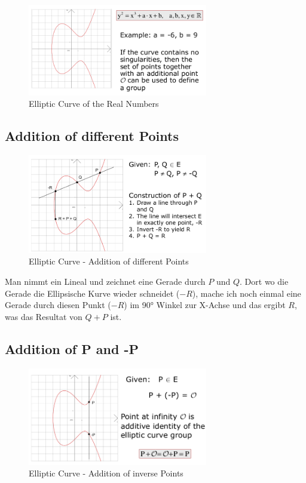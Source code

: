 \begin{figure}[H]
\centering
\includegraphics[width=0.7\textwidth]{figures/ellipticCurveRealNumbers.png}
\caption{Elliptic Curve of the Real Numbers}
\end{figure}

\hypertarget{addition-of-different-points}{%
\subsection{Addition of different
Points}\label{addition-of-different-points}}

\begin{figure}[H]
\centering
\includegraphics[width=0.7\textwidth]{figures/additionEllipse.png}
\caption{Elliptic Curve - Addition of different Points}
\end{figure}

Man nimmt ein Lineal und zeichnet eine Gerade durch $P$ und $Q$. Dort wo die Gerade die Ellipsische
Kurve wieder schneidet ($-R$), mache ich noch einmal eine Gerade durch
diesen Punkt ($-R$) im 90° Winkel zur X-Achse und das ergibt $R$, was das
Resultat von $Q+P$ ist.

\hypertarget{addition-of-p-and--p}{%
\subsection{Addition of P and -P}\label{addition-of-p-and--p}}

\begin{figure}[H]
\centering
\includegraphics[width=0.7\textwidth]{figures/addition2Ellipse.png}
\caption{Elliptic Curve - Addition of inverse Points}
\end{figure}

